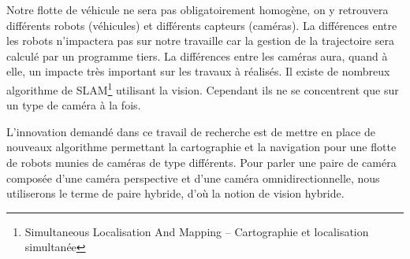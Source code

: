 
Notre flotte de véhicule ne sera pas obligatoirement homogène, on y retrouvera différents robots (véhicules) et différents capteurs (caméras).
La différences entre les robots n'impactera pas sur notre travaille car la gestion de la trajectoire sera calculé par un programme tiers.
La différences entre les caméras aura, quand à elle, un impacte très important sur les travaux à réalisés.
Il existe de nombreux algorithme de SLAM\footnote{Simultaneous Localisation And Mapping -- Cartographie et localisation simultanée} utilisant la vision.
Cependant ils ne se concentrent que sur un type de caméra à la fois.

L'innovation demandé dans ce travail de recherche est de mettre en place de nouveaux algorithme permettant la cartographie et la navigation pour une flotte de robots munies de caméras de type différents.
Pour parler une paire de caméra composée d'une caméra perspective et d'une caméra omnidirectionnelle, nous utiliserons le terme de paire hybride, d'où la notion de vision hybride.